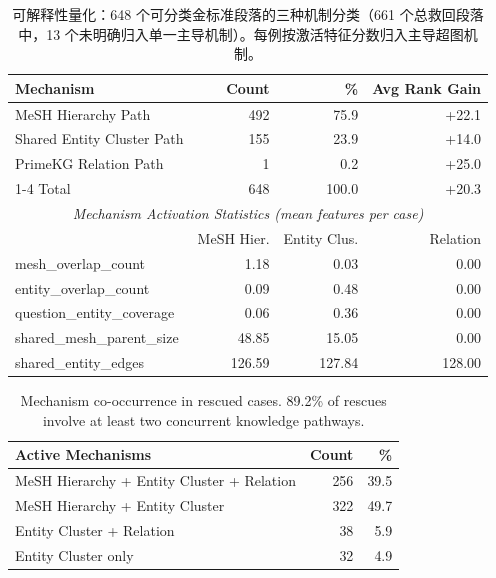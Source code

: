 \begin{table}[t]
\centering
\small
\caption{可解释性量化：648 个可分类金标准段落的三种机制分类（661 个总救回段落中，13 个未明确归入单一主导机制）。每例按激活特征分数归入主导超图机制。}
\label{tab:interpretability-mechanisms}
\begin{tabular}{lrrr}
\toprule
Mechanism & Count & \% & Avg Rank Gain \\
\midrule
MeSH Hierarchy Path & 492 & 75.9 & +22.1 \\
Shared Entity Cluster Path & 155 & 23.9 & +14.0 \\
PrimeKG Relation Path & 1 & 0.2 & +25.0 \\
\cmidrule{1-4}
Total & 648 & 100.0 & +20.3 \\
\midrule
\multicolumn{4}{c}{\textit{Mechanism Activation Statistics (mean features per case)}} \\
\midrule
 & MeSH Hier. & Entity Clus. & Relation \\
\midrule
mesh\_overlap\_count & 1.18 & 0.03 & 0.00 \\
entity\_overlap\_count & 0.09 & 0.48 & 0.00 \\
question\_entity\_coverage & 0.06 & 0.36 & 0.00 \\
shared\_mesh\_parent\_size & 48.85 & 15.05 & 0.00 \\
shared\_entity\_edges & 126.59 & 127.84 & 128.00 \\
\bottomrule
\end{tabular}
\end{table}

\begin{table}[t]
\centering
\small
\caption{Mechanism co-occurrence in rescued cases. 89.2\% of rescues involve at least two concurrent knowledge pathways.}
\label{tab:mech-cooccurrence}
\begin{tabular}{lrr}
\toprule
Active Mechanisms & Count & \% \\
\midrule
MeSH Hierarchy + Entity Cluster + Relation & 256 & 39.5 \\
MeSH Hierarchy + Entity Cluster & 322 & 49.7 \\
Entity Cluster + Relation & 38 & 5.9 \\
Entity Cluster only & 32 & 4.9 \\
\bottomrule
\end{tabular}
\end{table}
